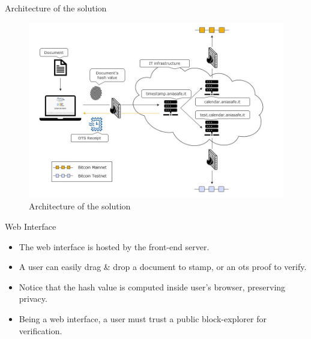\documentclass[usenames,dvipsnames]{beamer}
\begin{document}
     \begin{frame}{Architecture of the solution}
     \begin{figure}
         \centering
         \includegraphics[width=0.92\linewidth]{Images/project-stamping.png}
         \caption{Architecture of the solution}
     \end{figure}
    \end{frame}
    
    \begin{frame}{Web Interface}
        \begin{itemize}
            \item The \alert{web interface} is hosted by the front-end server.
            \item A user can easily \alert{drag \& drop} a document to \alert{stamp}, or an ots proof to \alert{verify}.
            \item Notice that the \alert{hash value} is computed inside user's browser, preserving \alert{privacy}.
            \item Being a web interface, a user must \alert{trust} a public \alert{block-explorer} for \alert{verification}.
        \end{itemize}
    \end{frame}
    
\end{document}
